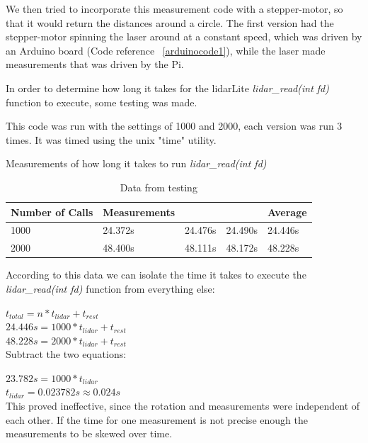 We then tried to incorporate this measurement code with a stepper-motor, so that it would return the distances around a circle. The first version had the stepper-motor spinning the laser around at a constant speed, which was driven by an Arduino board (Code reference ~\ref{arduinocode1}), while the laser made measurements that was driven by the Pi.

In order to determine how long it takes for the lidarLite \textit{lidar\_read(int fd)} function to execute, some testing was made.



This code was run with the settings of 1000 and 2000, each version was run 3 times. It was timed using the unix "time" utility.

Measurements of how long it takes to run \textit{lidar\_read(int fd)}

\begin{table}[H]
	\centering
	\begin{tabular}{|l|l|l|l|l|} \hline
            Number of Calls & Measurements & & & Average \\ \hline
            1000 & 24.372s & 24.476s & 24.490s & 24.446s \\ \hline
            2000 & 48.400s & 48.111s & 48.172s & 48.228s \\ \hline
	\end{tabular}
	\caption{Data from testing}
\end{table}

According to this data we can isolate the time it takes to execute the \textit{lidar\_read(int fd)} function from everything else:

$t_{total} = n*t_{lidar} + t_{rest}$ \\

$24.446s = 1000*t_{lidar} + t_{rest}$ \\
$48.228s = 2000*t_{lidar} + t_{rest}$ \\

Subtract the two equations:

$23.782s = 1000*t_{lidar}$ \\
$t_{lidar} = 0.023782s \approx 0.024s$ \\


This proved ineffective, since the rotation and measurements were independent of each other. If the time for one measurement is not precise enough the measurements to be skewed over time.

